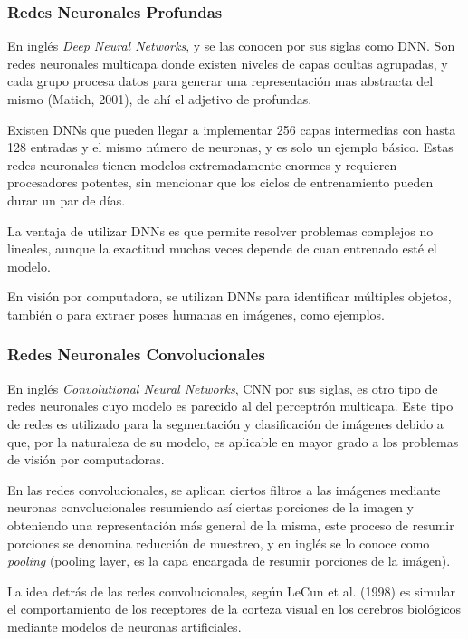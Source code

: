 \documentclass[a4paper,12pt,oneside,spanish]{book}
\begin{document}
\subsubsection{Redes Neuronales Profundas}
En inglés \textit{Deep Neural Networks}, y se las conocen por sus siglas como DNN. Son redes neuronales multicapa donde existen niveles de capas ocultas agrupadas, y cada grupo procesa datos para generar una representación mas abstracta del mismo (Matich, 2001), de ahí el adjetivo de profundas.\par

Existen DNNs que pueden llegar a implementar 256 capas intermedias con hasta 128 entradas y el mismo número de neuronas, y es solo un ejemplo básico. Estas redes neuronales tienen modelos extremadamente enormes y requieren procesadores potentes, sin mencionar que los ciclos de entrenamiento pueden durar un par de días.\par

La ventaja de utilizar DNNs es que permite resolver problemas complejos no lineales, aunque la exactitud muchas veces depende de cuan entrenado esté el modelo.\par

En visión por computadora, se utilizan DNNs para identificar múltiples objetos, también o para extraer poses humanas en imágenes, como ejemplos.\par

\subsubsection{Redes Neuronales Convolucionales}
En inglés \textit{Convolutional Neural Networks}, CNN por sus siglas, es otro tipo de redes neuronales cuyo modelo es parecido al del perceptrón multicapa. Este tipo de redes es utilizado para la segmentación y clasificación de imágenes debido a que, por la naturaleza de su modelo, es aplicable en mayor grado a los problemas de visión por computadoras.\par

En las redes convolucionales, se aplican ciertos filtros a las imágenes mediante neuronas convolucionales resumiendo así ciertas porciones de la imagen y obteniendo una representación más general de la misma, este proceso de resumir porciones se denomina reducción de muestreo, y en inglés se lo conoce como \textit{pooling} (pooling layer, es la capa encargada de resumir porciones de la imágen). \par

La idea detrás de las redes convolucionales, según LeCun et al. (1998) es simular el comportamiento de los receptores de la corteza visual en los cerebros biológicos mediante modelos de neuronas artificiales. \par
\end{document}
